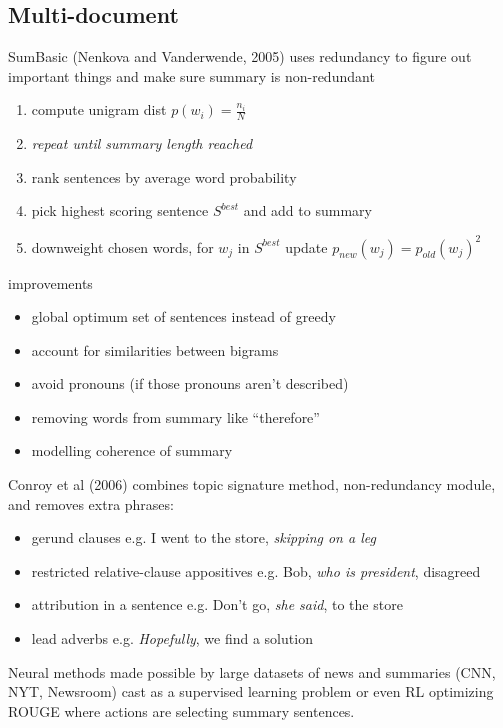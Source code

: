 \documentclass[]{article}
\theoremstyle{definition}
\begin{document}
\subsection{Multi-document}%
\label{sub:multi_document}

SumBasic (Nenkova and Vanderwende, 2005) uses redundancy to figure out important things and make sure summary is non-redundant
\begin{enumerate}
    \item compute unigram dist $p(w_i) = \frac{n_i}{N}$
    \item[] \textit{repeat until summary length reached}
    \item rank sentences by average word probability
    \item pick highest scoring sentence $S^{best}$ and add to summary
    \item downweight chosen words, for $w_j$ in $S^{best}$ update $p_{new}(w_j) = p_{old}(w_j)^2$
\end{enumerate}

improvements
\begin{itemize}
    \item global optimum set of sentences instead of greedy
    \item account for similarities between bigrams
    \item avoid pronouns (if those pronouns aren't described)
    \item removing words from summary like ``therefore''
    \item modelling coherence of summary
\end{itemize}

Conroy et al (2006) combines topic signature method, non-redundancy module, and removes extra phrases:
\begin{itemize}
    \item gerund clauses e.g. I went to the store, \textit{skipping on a leg}
    \item restricted relative-clause appositives e.g. Bob, \textit{who is president}, disagreed
    \item attribution in a sentence e.g. Don't go, \textit{she said}, to the store
    \item lead adverbs e.g. \textit{Hopefully}, we find a solution
\end{itemize}


Neural methods made possible by large datasets of news and summaries (CNN, NYT, Newsroom) cast as a supervised learning problem or even RL optimizing ROUGE where actions are selecting summary sentences.
\end{document}
